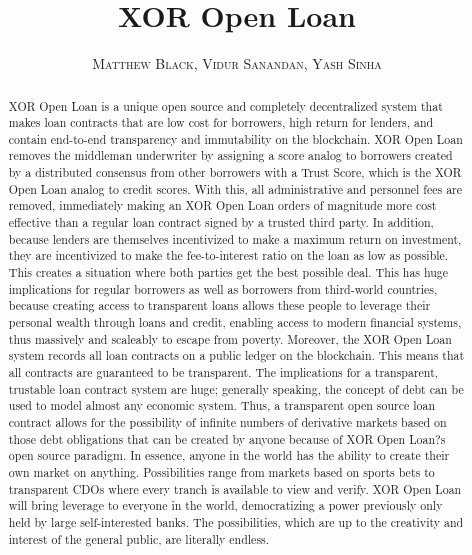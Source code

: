 \documentclass[twoside]{article}
\title{\vspace{-15mm}\fontsize{24pt}{10pt}\selectfont\textbf{XOR Open Loan}} %
\author{\large\textsc{Matthew Black, Vidur Sanandan, Yash Sinha}\\[2mm]} %
\date{}
\begin{document}
\maketitle %


\begin{abstract}
XOR Open Loan is a unique open source and completely decentralized system that makes loan contracts that are low cost for borrowers, high return for lenders, and contain end-to-end transparency and immutability on the blockchain. XOR Open Loan removes the middleman underwriter by assigning a score analog to borrowers created by a distributed consensus from other borrowers with a Trust Score, which is the XOR Open Loan analog to credit scores. With this, all administrative and personnel fees are removed, immediately making an XOR Open Loan orders of magnitude more cost effective than a regular loan contract signed by a trusted third party. In addition, because lenders are themselves incentivized to make a maximum return on investment, they are incentivized to make the fee-to-interest ratio on the loan as low as possible. This creates a situation where both parties get the best possible deal. This has huge implications for regular borrowers as well as borrowers from third-world countries, because creating access to transparent loans allows these people to leverage their personal wealth through loans and credit, enabling access to modern financial systems, thus massively and scaleably to escape from poverty.  Moreover, the XOR Open Loan system records all loan contracts on a public ledger on the blockchain. This means that all contracts are guaranteed to be transparent. The implications for a transparent, trustable loan contract system are huge; generally speaking, the concept of debt can be used to model almost any economic system. Thus, a transparent open source loan contract allows for the possibility of infinite numbers of derivative markets based on those debt obligations that can be created by anyone because of XOR Open Loan?s open source paradigm. In essence, anyone in the world has the ability to create their own market on anything. Possibilities range from markets based on sports bets to transparent CDOs where every tranch is available to view and verify. XOR Open Loan will bring leverage to everyone in the world, democratizing a power previously only held by large self-interested banks. The possibilities, which are up to the creativity and interest of the general public, are literally endless.
\end{abstract}
\end{document}
